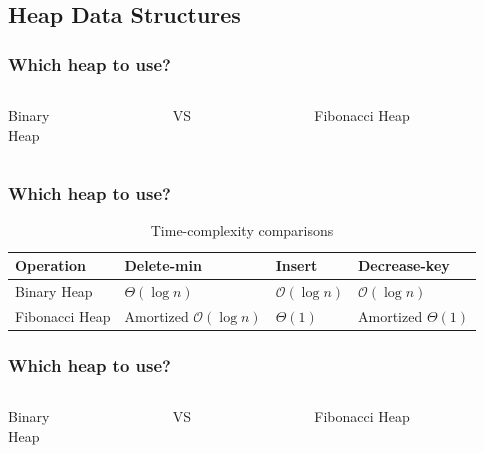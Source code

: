 \documentclass[14pt]{beamer}
\begin{document}
\subsection{Heap Data Structures}
\begin{frame}
	\frametitle{Which heap to use?}
	\begin{columns}[c]
		\begin{column}{0.4\textwidth}
			\begin{tcolorbox}
				\centering
				\Large
				Binary \\Heap
			\end{tcolorbox}
		\end{column}
		\begin{column}{0.1\textwidth}
			\centering VS
		\end{column}
		\begin{column}{0.4\textwidth}
			\begin{tcolorbox}
				\centering
				\Large
				Fibonacci Heap
			\end{tcolorbox}
		\end{column}
	\end{columns}
\end{frame}

\begin{frame}
	\frametitle{Which heap to use?}
	\renewcommand{\arraystretch}{2.0}
	\begin{table}[h]
		\centering
		\begin{tabular}{|p{}|p{}|p{}|p{0.2\textwidth}|}
			
			\hline
			Operation & Delete-min & Insert & Decrease-key \\
			\hline
			Binary Heap & $\Theta(\log{n})$ & $\mathcal{O}(\log{n})$ & $\mathcal{O}(\log{n})$ \\
			\hline
			Fibonacci Heap & Amortized  $\mathcal{O}(\log{n})$ & $\Theta(1)$ & Amortized $\Theta(1)$ \\
			\hline
		\end{tabular}
		\caption{Time-complexity comparisons}
	\end{table}
\end{frame}

\begin{frame}
	\frametitle{Which heap to use?}
	\begin{columns}[c]
		\begin{column}{0.4\textwidth}
			\begin{tcolorbox}[colback=darkeraccent, coltext=primary]
				\centering
				\Large
				Binary \\Heap
			\end{tcolorbox}
		\end{column}
		\begin{column}{0.1\textwidth}
			\centering VS
		\end{column}
		\begin{column}{0.4\textwidth}
			\begin{tcolorbox}[colback=accent]
				\centering
				\Large
				Fibonacci Heap
			\end{tcolorbox}
		\end{column}
	\end{columns}
\end{frame}
\end{document}
